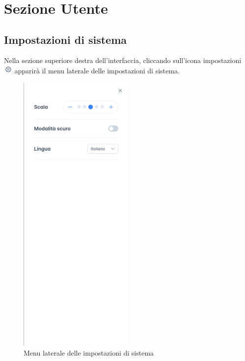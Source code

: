\section{Sezione Utente}
\label{sec:sezUtente}

\subsection{Impostazioni di sistema}
Nella sezione superiore destra dell'interfaccia, cliccando sull'icona impostazioni \includegraphics[height=1.2em]{assets/settings_icon.png} apparirà il menu laterale delle impostazioni di sistema.
\begin{figure}[H]
  \centering
  \includegraphics[width=0.50\textwidth]{assets/menu_config.png}
  \caption{Menu laterale delle impostazioni di sistema}
\end{figure}
